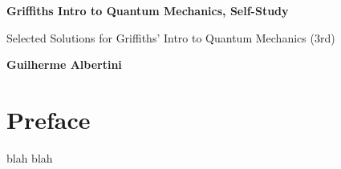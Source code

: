 \documentclass[titlepage]{book}
\begin{document}
\begin{titlepage}
    \begin{center}
        \vspace*{1cm}
            
        \Huge
        \textbf{Griffiths Intro to Quantum Mechanics, Self-Study}
            
        \vspace{0.5cm}
        \LARGE
        Selected Solutions for Griffiths' Intro to Quantum Mechanics (3rd)
            
        \vspace{1.5cm}
            
        \textbf{Guilherme Albertini}
            
        \vfill
            
            
        \vspace{0.8cm}
            

        \Large
        
            
    \end{center}
\end{titlepage}

\frontmatter
\tableofcontents

\chapter*{Preface}

\TODO blah blah

\mainmatter



\end{document}
